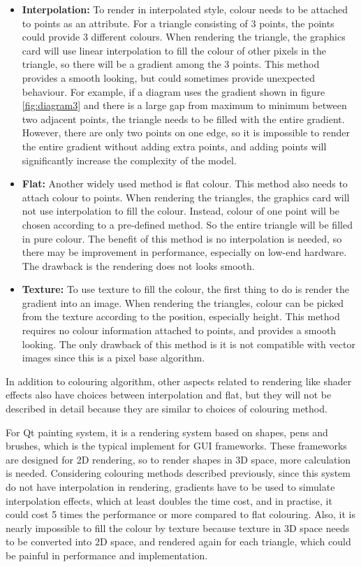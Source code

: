 \begin{itemize}
	\item \textbf{Interpolation:} To render in interpolated style, colour needs to be attached to points as an attribute. For a triangle consisting of 3 points, the points could provide 3 different colours. When rendering the triangle, the graphics card will use linear interpolation to fill the colour of other pixels in the triangle, so there will be a gradient among the 3 points. This method provides a smooth looking, but could sometimes provide unexpected behaviour. For example, if a diagram uses the gradient shown in figure \ref{fig:diagram3} and there is a large gap from maximum to minimum between two adjacent points, the triangle needs to be filled with the entire gradient. However, there are only two points on one edge, so it is impossible to render the entire gradient without adding extra points, and adding points will significantly increase the complexity of the model.
	\item \textbf{Flat:} Another widely used method is flat colour. This method also needs to attach colour to points. When rendering the triangles, the graphics card will not use interpolation to fill the colour. Instead, colour of one point will be chosen according to a pre-defined method. So the entire triangle will be filled in pure colour. The benefit of this method is no interpolation is needed, so there may be improvement in performance, especially on low-end hardware. The drawback is the rendering does not looks smooth.
	\item \textbf{Texture:} To use texture to fill the colour, the first thing to do is render the gradient into an image. When rendering the triangles, colour can be picked from the texture according to the position, especially height. This method requires no colour information attached to points, and provides a smooth looking. The only drawback of this method is it is not compatible with vector images since this is a pixel base algorithm.
\end{itemize}

In addition to colouring algorithm, other aspects related to rendering like shader effects also have choices between interpolation and flat, but they will not be described in detail because they are similar to choices of colouring method.

For Qt painting system, it is a rendering system based on shapes, pens and brushes, which is the typical implement for GUI frameworks. These frameworks are designed for 2D rendering, so to render shapes in 3D space, more calculation is needed. Considering colouring methods described previously, since this system do not have interpolation in rendering, gradients have to be used to simulate interpolation effects, which at least doubles the time cost, and in practise, it could cost 5 times the performance or more compared to flat colouring. Also, it is nearly impossible to fill the colour by texture because texture in 3D space needs to be converted into 2D space, and rendered again for each triangle, which could be painful in performance and implementation.

